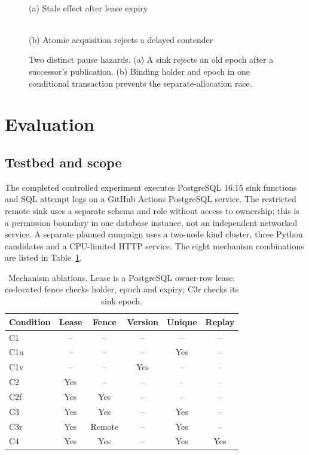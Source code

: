 \documentclass[conference,10pt]{IEEEtran}
\begin{document}
\begin{figure}[t]\centering
\begin{minipage}{.48\textwidth}\centering\\(a) Stale effect after lease expiry\end{minipage}\hfill
\begin{minipage}{.48\textwidth}\centering\\(b) Atomic acquisition rejects a delayed contender\end{minipage}
\caption{Two distinct pause hazards. (a) A sink rejects an old epoch after a successor's publication. (b) Binding holder and epoch in one conditional transaction prevents the separate-allocation race.}\label{fig:zombie}
\end{figure}

\section{Evaluation}
\subsection{Testbed and scope}
The completed controlled experiment executes PostgreSQL 16.15 sink functions and SQL attempt logs on a GitHub Actions PostgreSQL service. The restricted remote sink uses a separate schema and role without access to ownership; this is a permission boundary in one database instance, not an independent networked service. A separate planned campaign uses a two-node kind cluster, three Python candidates and a CPU-limited HTTP service. The eight mechanism combinations are listed in Table~\ref{tab:ablation}.

\begin{table}[t]\caption{Mechanism ablations. Lease is a PostgreSQL owner-row lease; co-located fence checks holder, epoch and expiry; C3r checks its sink epoch.}\label{tab:ablation}
\centering\footnotesize
\setlength{\tabcolsep}{2.5pt}
\begin{tabular}{lccccc}\toprule
Condition & Lease & Fence & Version & Unique & Replay\\\midrule
C1 & -- & -- & -- & -- & --\\
C1u & -- & -- & -- & Yes & --\\
C1v & -- & -- & Yes & -- & --\\
C2 & Yes & -- & -- & -- & --\\
C2f & Yes & Yes & -- & -- & --\\
C3 & Yes & Yes & -- & Yes & --\\
C3r & Yes & Remote & -- & Yes & --\\
C4 & Yes & Yes & -- & Yes & Yes\\\bottomrule
\end{tabular}
\end{table}
\end{document}
